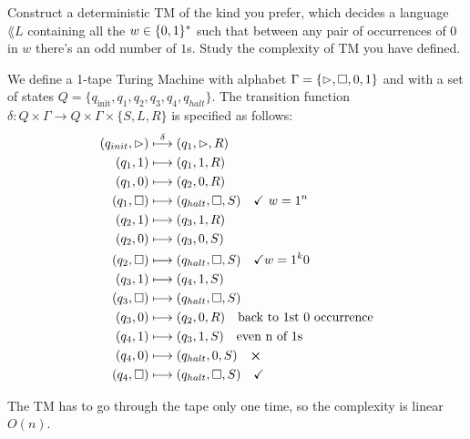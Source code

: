 \begin{ex}
	Construct a deterministic TM of the kind you prefer, which decides a language $\lang{L}$ containing all the $w \in \{ 0,1 \}^* $ such that between any pair of occurrences of $0$ in $w$ there's  an odd number of $1$s.
	Study the complexity of TM you have defined.
\end{ex}
\begin{solution}
	We define a 1-tape Turing Machine with alphabet $\Gamma = \{\rhd,\square,0,1\}$ and with a set of states $Q = \{q_{\text{init}}, q_1, q_2, q_3, q_4, q_{halt}\}$. The transition function $\delta : Q \times \Gamma \to Q \times \Gamma \times \{ S,L,R \}$ is specified as follows:
	\begin{align*}
		(q_{init}, \rhd) & \overset{\delta}{\longmapsto} (q_1,\rhd,R)                \\
		(q_1,1)            & \longmapsto (q_1,1,R)                                       \\
		(q_1,0)            & \longmapsto (q_2,0,R)                                       \\
		(q_1,\square)       & \longmapsto (q_{halt}, \square, S) \quad \checkmark \ w = 1^n  \\
		(q_2, 1)           & \longmapsto(q_3,1,R)                                        \\
		(q_2,0)            & \longmapsto(q_3,0,S)                                        \\
		(q_2,\square)       & \longmapsto(q_{halt}, \square,S) \quad \checkmark w = 1^k0     \\
		(q_3, 1)           & \longmapsto (q_4,1,S)                                       \\
		(q_3, \square)      & \longmapsto(q_{halt}, \square,S)                             \\
		(q_3,0)            & \longmapsto (q_2,0,R) \quad \text{back to 1st 0 occurrence} \\
		(q_4, 1)           & \longmapsto (q_3,1,S) \quad \text{even n of 1s}             \\
		(q_4,0)            & \longmapsto (q_{halt},0,S) \quad \bm{\times}                      \\
		(q_4,\square)       & \longmapsto (q_{halt}, \square, S) \quad \checkmark
	\end{align*}


	The TM has to go through the tape only one time, so the complexity is linear $O(n)$.
\end{solution}


